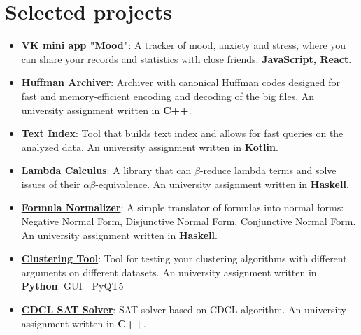 \documentclass[letterpaper,11pt]{article}
\newcommand{\resumeItem}[2]{
  \item\small{
    \textbf{#1}{: #2 \vspace{-2pt}}
  }
}
\newcommand{\resumeSubItem}[2]{\resumeItem{#1}{#2}\vspace{-4pt}}
\newcommand{\resumeSubHeadingListStart}{\begin{itemize}[leftmargin=*]}
\newcommand{\resumeSubHeadingListEnd}{\end{itemize}}
\begin{document}
\section{Selected projects}
  \resumeSubHeadingListStart
    \resumeSubItem{\href{https://github.com/Danverr/vk-app}{VK mini app "Mood"}}
      {A tracker of mood, anxiety and stress, where you can share your records and statistics with close friends. \textbf{JavaScript, React}.}
    \resumeSubItem{\href{https://github.com/Astronomax/huffman}{Huffman Archiver}}
      {Archiver with canonical Huffman codes designed for fast and memory-efficient encoding and decoding of the big files. An university assignment written in \textbf{C++}.}
    \resumeSubItem{Text Index}
      {Tool that builds text index and allows for fast queries on the analyzed data.  An university assignment written in \textbf{Kotlin}.}
    \resumeSubItem{Lambda Calculus}
      {A library that can $\beta$-reduce lambda terms and solve issues of their $\alpha\beta$-equivalence. An university assignment written in \textbf{Haskell}.}
    \resumeSubItem{\href{https://github.com/Astronomax/formula-normalizer}{Formula Normalizer}}
      {A simple translator of formulas into normal forms: Negative Normal Form, Disjunctive Normal Form, Conjunctive Normal Form. An university assignment written in \textbf{Haskell}.}
    \resumeSubItem{\href{https://github.com/Dimch84/ClusteringTool}{Clustering Tool}}
      {Tool for testing your clustering algorithms with different arguments on different datasets. An university assignment written in \textbf{Python}. GUI - PyQT5}
    \resumeSubItem{\href{https://github.com/Astronomax/cdcl-sat-solver}{CDCL SAT Solver}}
      {SAT-solver based on CDCL algorithm. An university assignment written in \textbf{C++}.}
  \resumeSubHeadingListEnd

\end{document}
